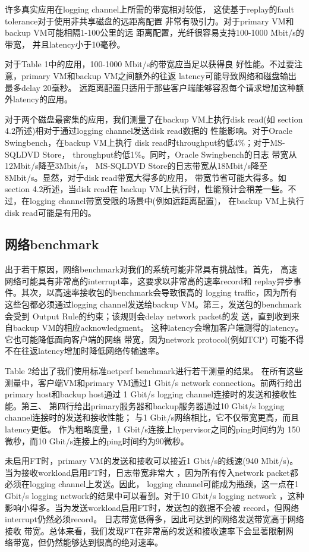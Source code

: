 许多真实应用在logging channel上所需的带宽相对较低，%
这使基于replay的fault tolerance对于使用非共享磁盘的远距离配置%
非常有吸引力。对于primary VM和backup VM可能相隔1-100公里的远%
距离配置，光纤很容易支持100-1000 Mbit/s的带宽，%
并且latency小于10毫秒。%

对于Table 1中的应用，100-1000 Mbit/s的带宽应当足以获得良%
好性能。不过要注意，primary VM和backup VM之间额外的往返%
latency可能导致网络和磁盘输出最多delay 20毫秒。%
远距离配置只适用于那些客户端能够容忍每个请求增加这种额外latency的应用。%

对于两个磁盘最密集的应用，我们测量了在backup VM上执行disk read(如%
section 4.2所述)相对于通过logging channel发送disk read数据的%
性能影响。对于Oracle Swingbench，在backup VM上执行%
disk read时throughput约低4\%；对于MS-SQLDVD Store，%
throughput约低1\%。同时，Oracle Swingbench的日志%
带宽从12Mbit/s降至3Mbit/s，%
MS-SQLDVD Store的日志带宽从18Mbit/s降至%
8Mbit/s。显然，对于disk read带宽大得多的应用，%
带宽节省可能大得多。如section 4.2所述，当disk read在%
backup VM上执行时，性能预计会稍差一些。不过，在logging %
channel带宽受限的场景中(例如远距离配置)，%
在backup VM上执行disk read可能是有用的。

\subsection{网络benchmark}

\inserttabletwo

出于若干原因，网络benchmark对我们的系统可能非常具有挑战性。首先，%
高速网络可能具有非常高的interrupt率，这要求以非常高的速率record和%
replay异步事件。其次，以高速率接收包的benchmark会导致很高的%
logging traffic，因为所有这些包都必须通过logging %
channel发送给backup VM。第三，发送包的benchmark会受到%
Output Rule的约束；该规则会delay network packet的发%
送，直到收到来自backup VM的相应acknowledgment。%
这种latency会增加客户端测得的latency。它也可能降低面向客户端的网络%
带宽，因为network protocol(例如TCP)%
可能不得不在往返latency增加时降低网络传输速率。%

Table 2给出了我们使用标准netperf benchmark进行若干测量的结果。%
在所有这些测量中，客户端VM和primary VM通过1 Gbit/s %
network connection。前两行给出primary host和backup host通过%
1 Gbit/s logging channel连接时的发送和接收性能。第三、%
第四行给出primary服务器和backup服务器通过10 %
Gbit/s logging channel连接时的发送和接收性能；%
与1 Gbit/s网络相比，它不仅带宽更高，而且latency更低。%
作为粗略度量，1 Gbit/s连接上hypervisor之间的ping时间约为%
150微秒，而10 Gbit/s连接上的ping时间约为90微秒。%

未启用FT时，primary VM的发送和接收可以接近1 Gbit/s的线速(940 %
Mbit/s)。当为接收workload启用FT时，日志带宽非常大%
，因为所有传入network packet都必须在logging channel上发送。因此，%
logging channel可能成为瓶颈，这一点在1 Gbit/s logging %
network的结果中可以看到。对于10 Gbit/s logging network%
，这种影响小得多。当为发送workload启用FT时，发送包的数据不会被%
record，但网络interrupt仍然必须record。%
日志带宽低得多，因此可达到的网络发送带宽高于网络接收%
带宽。总体来看，我们发现FT在非常高的发送和接收速率下会显著限制网%
络带宽，但仍然能够达到很高的绝对速率。
